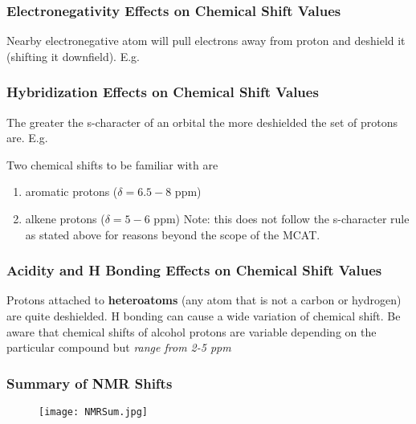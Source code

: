 \documentclass[../OChemReview.tex]{subfiles}
\begin{document}
	\subsubsection{Electronegativity Effects on Chemical Shift Values}
	
	Nearby electronegative atom will pull electrons away from proton and deshield it (shifting it downfield). E.g.
	
	\begin{figure}[h]
		\centering
		 \qquad
		\qquad
	\end{figure}
	
	\subsubsection{Hybridization Effects on Chemical Shift Values}
	
	The greater the s-character of an orbital the more deshielded the set of protons are. E.g.
	
	\begin{figure}[h]
		\centering
		\qquad
	\end{figure}
	
	Two chemical shifts to be familiar with are
	\begin{enumerate}
		\item aromatic protons ($ \delta = 6.5-8 $ ppm)
		\item alkene protons ($ \delta = 5-6 $ ppm) Note: this does not
                  follow the s-character rule as stated above for reasons beyond
                  the scope of the MCAT.
	\end{enumerate}
	
	\subsubsection{Acidity and H Bonding Effects on Chemical Shift Values}
	
	Protons attached to \textbf{heteroatoms} (any atom that is not a carbon or hydrogen) are quite deshielded. H bonding can cause a wide variation of chemical shift. Be aware that chemical shifts of alcohol protons are variable depending on the particular compound but \emph{range from 2-5 ppm}
	
	\begin{figure}[h]
		\centering
		\qquad
	\end{figure}
	
	\newpage
	\subsubsection{Summary of NMR Shifts}
	
	\begin{figure}[h]
		\centering
		\texttt{[image: NMRSum.jpg]}
	\end{figure}
\end{document}

